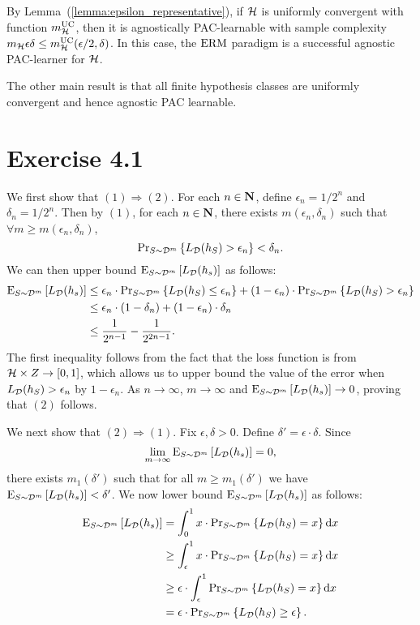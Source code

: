 By Lemma~(\ref{lemma:epsilon_representative}), if $\mathcal{H}$ is uniformly
convergent with function $m_{\mathcal{H}}^{\text{UC}}$, then it is agnostically PAC-learnable
with sample complexity $m_{\mathcal{H}}{\epsilon}{\delta} \leq
m_{\mathcal{H}}^{\text{UC}}(\epsilon / 2, \delta)$. In this case, the $\operatorname{ERM}$ paradigm is a
successful agnostic PAC-learner for $\mathcal{H}$.

The other main result is that all finite hypothesis classes are uniformly convergent
and hence agnostic PAC learnable. 

\section*{Exercise 4.1}

We first show that $(1) \Rightarrow (2)$. For each $n \in \mathbf{N}$, define 
$\epsilon_n = 1 / 2^n$ and $\delta_n = 1 / 2^n$. Then by $(1)$, for each 
$n \in \mathbf{N}$, there exists $m(\epsilon_n, \delta_n)$ such that 
$\forall m \geq m(\epsilon_n, \delta_n)$, 
\[
    \text{Pr}_{S \sim \mathcal{D}^{m}} \left \{ L_{\mathcal{D}} (h_S) > \epsilon_n \right \} < \delta_n.
\]
We can then upper bound $\text{E}_{S \sim \mathcal{D}^m} \left [ L_{\mathcal{D}}(h_s) \right ]$ as follows:
\begin{align*}
\text{E}_{S \sim \mathcal{D}^m} \left [ L_{\mathcal{D}} (h_s) \right ] 
& \leq \epsilon_n \cdot  \text{Pr}_{S \sim \mathcal{D}^{m}} \left \{ L_{\mathcal{D}} (h_S) \leq \epsilon_n \right \} +
    (1 - \epsilon_n) \cdot  \text{Pr}_{S \sim \mathcal{D}^{m}} \left \{ L_{\mathcal{D}} (h_S) > \epsilon_n \right \} \\
& \leq \epsilon_n \cdot (1 - \delta_n) + (1 - \epsilon_n) \cdot \delta_n \\
& \leq \frac{1}{2^{n - 1}} - \frac{1}{2^{2n - 1}}.      
\end{align*}
The first inequality follows from the fact that the loss function is from 
$\mathcal{H} \times Z \rightarrow [0, 1]$, which allows us to upper bound the value of the error
when $L_{\mathcal{D}} (h_S) > \epsilon_n$ by $1 - \epsilon_n$. As $n \to \infty$, $m \to \infty$ 
and $\text{E}_{S \sim \mathcal{D}^m} \left [ L_{\mathcal{D}} (h_s) \right ] \to 0$, proving that $(2)$ follows.

We next show that $(2) \Rightarrow (1)$. Fix $\epsilon, \delta > 0$. Define
$\delta' = \epsilon \cdot \delta$. Since 
$$\lim_{m \to \infty} \text{E}_{S \sim \mathcal{D}^m} \left [ L_{\mathcal{D}}(h_s) \right ] = 0,$$ 
there exists $m_1(\delta')$ such that for all $m
\geq m_1(\delta')$ we have $\text{E}_{S \sim \mathcal{D}^m} \left [ L_{\mathcal{D}}(h_s) \right ] < \delta'$.
We now lower bound $\text{E}_{S \sim \mathcal{D}^m} \left [ L_{\mathcal{D}}(h_s) \right ]$ as follows:
\begin{align*}
\text{E}_{S \sim \mathcal{D}^m} \left [ L_{\mathcal{D}}(h_s) \right ] 
& = \int_{0}^{1} x \cdot  \text{Pr}_{S \sim \mathcal{D}^{m}} \left \{ L_{\mathcal{D}} (h_S) = x \right \} \text{d} x \\
& \geq \int_{\epsilon}^1 x \cdot  \text{Pr}_{S \sim \mathcal{D}^{m}} \left \{ L_{\mathcal{D}} (h_S) = x \right \} \text{d} x \\
& \geq \epsilon \cdot \int_{\epsilon}^1 \text{Pr}_{S \sim \mathcal{D}^{m}} \left \{ L_{\mathcal{D}} (h_S) = x \right \} \text{d} x \\
& = \epsilon \cdot  \text{Pr}_{S \sim \mathcal{D}^{m}} \left \{ L_{\mathcal{D}} (h_S) \geq \epsilon \right \}. 
\end{align*}

